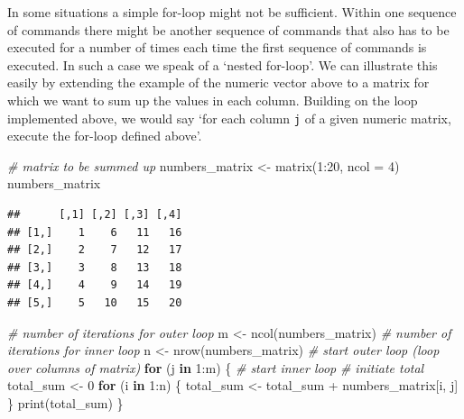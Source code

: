\documentclass[
  12pt,
]{style/krantz}
\newenvironment{Shaded}{\begin{snugshade}}{\end{snugshade}}
\newcommand{\AttributeTok}[1]{\textcolor[rgb]{0.77,0.63,0.00}{#1}}
\newcommand{\CommentTok}[1]{\textcolor[rgb]{0.56,0.35,0.01}{\textit{#1}}}
\newcommand{\ControlFlowTok}[1]{\textcolor[rgb]{0.13,0.29,0.53}{\textbf{#1}}}
\newcommand{\DecValTok}[1]{\textcolor[rgb]{0.00,0.00,0.81}{#1}}
\newcommand{\FunctionTok}[1]{\textcolor[rgb]{0.00,0.00,0.00}{#1}}
\newcommand{\NormalTok}[1]{#1}
\newcommand{\OtherTok}[1]{\textcolor[rgb]{0.56,0.35,0.01}{#1}}
\newcommand{\SpecialCharTok}[1]{\textcolor[rgb]{0.00,0.00,0.00}{#1}}
\begin{document}
In some situations a simple for-loop might not be sufficient. Within one sequence of commands there might be another sequence of commands that also has to be executed for a number of times each time the first sequence of commands is executed. In such a case we speak of a `nested for-loop'. We can illustrate this easily by extending the example of the numeric vector above to a matrix for which we want to sum up the values in each column. Building on the loop implemented above, we would say `for each column \texttt{j} of a given numeric matrix, execute the for-loop defined above'.

\begin{Shaded}
\begin{Highlighting}[]
\CommentTok{\# matrix to be summed up}
\NormalTok{numbers\_matrix }\OtherTok{\textless{}{-}} \FunctionTok{matrix}\NormalTok{(}\DecValTok{1}\SpecialCharTok{:}\DecValTok{20}\NormalTok{, }\AttributeTok{ncol =} \DecValTok{4}\NormalTok{)}
\NormalTok{numbers\_matrix}
\end{Highlighting}
\end{Shaded}

\begin{verbatim}
##      [,1] [,2] [,3] [,4]
## [1,]    1    6   11   16
## [2,]    2    7   12   17
## [3,]    3    8   13   18
## [4,]    4    9   14   19
## [5,]    5   10   15   20
\end{verbatim}

\begin{Shaded}
\begin{Highlighting}[]
\CommentTok{\# number of iterations for outer loop}
\NormalTok{m }\OtherTok{\textless{}{-}} \FunctionTok{ncol}\NormalTok{(numbers\_matrix)}
\CommentTok{\# number of iterations for inner loop}
\NormalTok{n }\OtherTok{\textless{}{-}} \FunctionTok{nrow}\NormalTok{(numbers\_matrix)}
\CommentTok{\# start outer loop (loop over columns of matrix)}
\ControlFlowTok{for}\NormalTok{ (j }\ControlFlowTok{in} \DecValTok{1}\SpecialCharTok{:}\NormalTok{m) \{}
     \CommentTok{\# start inner loop}
     \CommentTok{\# initiate total}
\NormalTok{     total\_sum }\OtherTok{\textless{}{-}} \DecValTok{0}
     \ControlFlowTok{for}\NormalTok{ (i }\ControlFlowTok{in} \DecValTok{1}\SpecialCharTok{:}\NormalTok{n) \{}
\NormalTok{          total\_sum }\OtherTok{\textless{}{-}}\NormalTok{ total\_sum }\SpecialCharTok{+}\NormalTok{ numbers\_matrix[i, j]}
\NormalTok{          \}}
     \FunctionTok{print}\NormalTok{(total\_sum)}
\NormalTok{     \}}
\end{Highlighting}
\end{Shaded}
\end{document}
